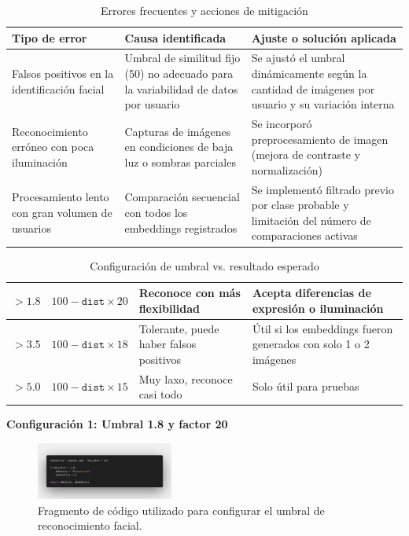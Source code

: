 \documentclass[10pt,a4paper]{article}
\begin{document}
\begin{multicols}{2}
\begin{table}[H]
    \centering
    \caption{Errores frecuentes y acciones de mitigación}
    \label{tab:errores_ajustes}
    \renewcommand{\arraystretch}{1.3}
    \begin{tabular}{|p{2cm}|p{2cm}|p{2cm}|}
        \hline
        \textbf{Tipo de error} & \textbf{Causa identificada} & \textbf{Ajuste o solución aplicada} \\
        \hline
        Falsos positivos en la identificación facial & Umbral de similitud fijo (50) no adecuado para la variabilidad de datos por usuario & Se ajustó el umbral dinámicamente según la cantidad de imágenes por usuario y su variación interna \\
        \hline
        Reconocimiento erróneo con poca iluminación & Capturas de imágenes en condiciones de baja luz o sombras parciales & Se incorporó preprocesamiento de imagen (mejora de contraste y normalización) \\
		\hline
		Procesamiento lento con gran volumen de usuarios & Comparación secuencial con todos los embeddings registrados & Se implementó filtrado previo por clase probable y limitación del número de comparaciones activas \\
		\hline
    \end{tabular}
\end{table}
\vspace{-1cm}

\begin{table}[H]
\centering
\caption{Configuración de umbral vs. resultado esperado}
\label{tab:umbral_similitud}
\renewcommand{\arraystretch}{1.3}
\scriptsize
\begin{tabular}{|p{1cm}|p{0.9cm}|p{1.8cm}|p{1.5cm}|}
\hline
\hline
$> 1.8$ & $100 - \texttt{dist} \times 20$ & Reconoce con más flexibilidad & Acepta diferencias de expresión o iluminación \\
\hline
$> 3.5$ & $100 - \texttt{dist} \times 18$ & Tolerante, puede haber falsos positivos & Útil si los embeddings fueron generados con solo 1 o 2 imágenes \\
\hline
$> 5.0$ & $100 - \texttt{dist} \times 15$ & Muy laxo, reconoce casi todo & Solo útil para pruebas \\
\hline
\end{tabular}
\end{table}
\vspace{-1cm}


\textbf{Configuración 1: Umbral 1.8 y factor 20}

\begin{figure}[H]
    \centering
    \includegraphics[width=0.4\textwidth]{imagenes/3.png}
    \caption{Fragmento de código utilizado para configurar el umbral de reconocimiento facial.}
\end{figure}
\vspace{-0.5cm}


\end{multicols}
\end{document}
